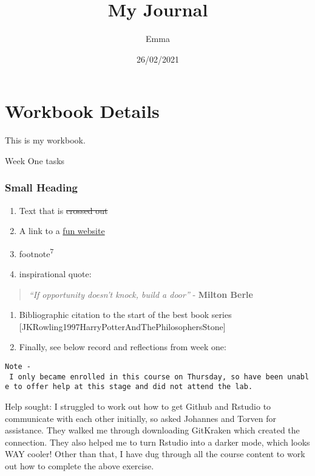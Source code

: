 \documentclass[
]{article}
\title{My Journal}
\author{Emma}
\date{26/02/2021}
\providecommand{\tightlist}{%
  \setlength{\itemsep}{0pt}\setlength{\parskip}{0pt}}
\begin{document}
\maketitle

\hypertarget{workbook-details}{%
\section{Workbook Details}\label{workbook-details}}

This is my workbook.

Week One tasks

\hypertarget{small-heading}{%
\subsubsection{Small Heading}\label{small-heading}}

\begin{enumerate}
\def\labelenumi{\arabic{enumi}.}
\setcounter{enumi}{1}
\tightlist
\item
  Text that is \sout{crossed out}\\
\item
  A link to a \href{windy.com}{fun website}\\
\item
  footnote\textsuperscript{7}\\
\item
  inspirational quote:\\
\end{enumerate}

\begin{quote}
\emph{``If opportunity doesn't knock, build a door''} - \textbf{Milton
Berle}~
\end{quote}

\begin{enumerate}
\def\labelenumi{\arabic{enumi}.}
\setcounter{enumi}{5}
\item
  Bibliographic citation to the start of the best book series
  {[}JKRowling1997HarryPotterAndThePhilosophersStone{]}\\
\item
  Finally, see below record and reflections from week one:~
\end{enumerate}

\texttt{Note\ -\ I\ only\ became\ enrolled\ in\ this\ course\ on\ Thursday,\ so\ have\ been\ unable\ to\ offer\ help\ at\ this\ stage\ and\ did\ not\ attend\ the\ lab.}

Help sought: I struggled to work out how to get Github and Rstudio to
communicate with each other initially, so asked Johannes and Torven for
assistance. They walked me through downloading GitKraken which created
the connection. They also helped me to turn Rstudio into a darker mode,
which looks WAY cooler! Other than that, I have dug through all the
course content to work out how to complete the above exercise.\\
\end{document}
